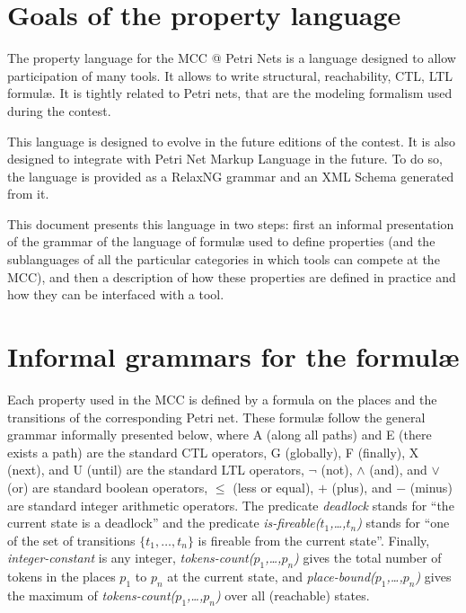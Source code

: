 \documentclass[10pt,english,a4paper]{article}
\newcommand{\mcc}[0]{MCC}
\begin{document}
\color{defaultcolor}

\section*{Goals of the property language}
The property language for the \mcc{} @ Petri Nets is a language designed to allow
participation of many tools.
It allows to write structural, reachability, CTL, LTL formul{\ae}.
It is tightly related to Petri nets, that are the modeling formalism used during the contest.

This language is designed to evolve in the future editions of the contest.
It is also designed to integrate with Petri Net Markup Language in the future.
To do so, the language is provided as a RelaxNG grammar and an XML Schema generated from it.

This document presents this language in two steps: first an informal presentation of the grammar of the language of formulæ used to define properties (and the sublanguages of all the particular categories in which tools can compete at the MCC), and then a description of how these properties are defined in practice and how they can be interfaced with a tool.

\tableofcontents
\clearpage

\section{Informal grammars for the formulæ}

Each property used in the MCC is defined by a formula on the places and the transitions of the corresponding Petri net. These formulæ follow the general grammar informally presented below, where A (along all paths) and E (there exists a path) are the standard CTL operators, G (globally), F (finally), X (next), and U (until) are the standard LTL operators, $\lnot$ (not), $\wedge$ (and), and $\vee$ (or) are standard boolean operators, $\leq$ (less or equal), $+$ (plus), and $-$ (minus) are standard integer arithmetic operators.
The predicate \emph{deadlock} stands for ``the current state is a deadlock'' and the predicate \emph{is-fireable($t_1$,\dots,$t_n$)} stands for ``one of the set of transitions $\{t_1,\dots,t_n\}$ is fireable from the current state''.
Finally, \emph{integer-constant} is any integer, \emph{tokens-count($p_1$,\dots,$p_n$)} gives the total number of tokens in the places $p_1$ to $p_n$ at the current state, and \emph{place-bound($p_1$,\dots,$p_n$)} gives the maximum of \emph{tokens-count($p_1$,\dots,$p_n$)} over all (reachable) states.
\end{document}
